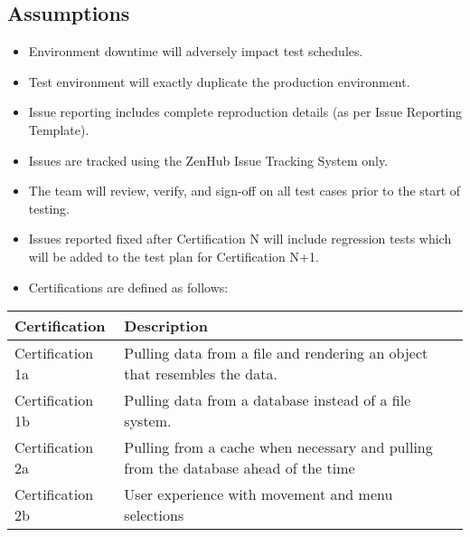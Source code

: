 \documentclass[letterpaper,10pt,english]{sphinxmanual}
\begin{document}
\subsection{Assumptions}
\label{\detokenize{test_plan/strategy:assumptions}}
\begin{itemize}
\item {} 
Environment downtime will adversely impact test schedules.

\item {} 
Test environment will exactly duplicate the production environment.

\item {} 
Issue reporting includes complete reproduction details (as per Issue Reporting Template).

\item {} 
Issues are tracked using the ZenHub Issue Tracking System only.

\item {} 
The team will review, verify, and sign-off on all test cases prior to the start of testing.

\item {} 
Issues reported fixed after Certification N will include regression tests which will be added to the test plan for Certification N+1.

\end{itemize}

\begin{itemize}
\item {} 
Certifications are defined as follows:

\end{itemize}


\begin{savenotes}\sphinxattablestart
\centering
\begin{tabulary}{\linewidth}[t]{|T|T|}
\hline
\sphinxstyletheadfamily 
Certification
&\sphinxstyletheadfamily 
Description
\\
\hline
Certification 1a
&
Pulling data from a file and rendering an object that resembles the data.
\\
\hline
Certification 1b
&
Pulling data from a database instead of a file system.
\\
\hline
Certification 2a
&
Pulling from a cache when necessary and pulling from the database ahead of the time
\\
\hline
Certification 2b
&
User experience with movement and menu selections
\\
\hline
\end{tabulary}
\par
\sphinxattableend\end{savenotes}
\end{document}
